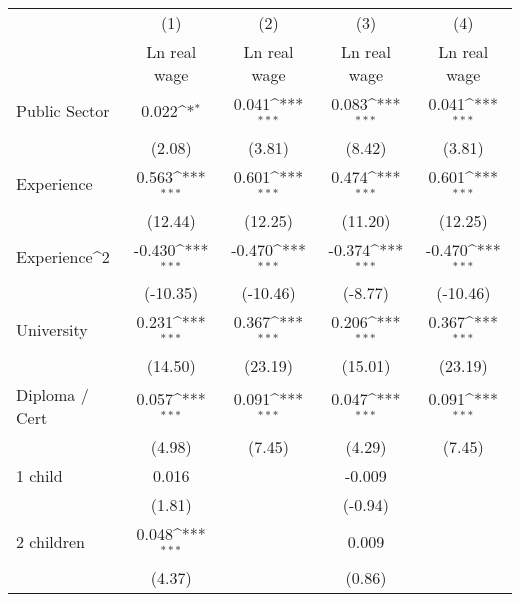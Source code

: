 {
\def\sym#1{\ifmmode^{#1}\else\(^{#1}\)\fi}
\begin{tabular}{l*{4}{c}}
\hline\hline
                    &\multicolumn{1}{c}{(1)}&\multicolumn{1}{c}{(2)}&\multicolumn{1}{c}{(3)}&\multicolumn{1}{c}{(4)}\\
                    &\multicolumn{1}{c}{Ln real wage}&\multicolumn{1}{c}{Ln real wage}&\multicolumn{1}{c}{Ln real wage}&\multicolumn{1}{c}{Ln real wage}\\
\hline
Public Sector       &       0.022\sym{*}  &       0.041\sym{***}&       0.083\sym{***}&       0.041\sym{***}\\
                    &      (2.08)         &      (3.81)         &      (8.42)         &      (3.81)         \\
[1em]
Experience          &       0.563\sym{***}&       0.601\sym{***}&       0.474\sym{***}&       0.601\sym{***}\\
                    &     (12.44)         &     (12.25)         &     (11.20)         &     (12.25)         \\
[1em]
Experience^{2}      &      -0.430\sym{***}&      -0.470\sym{***}&      -0.374\sym{***}&      -0.470\sym{***}\\
                    &    (-10.35)         &    (-10.46)         &     (-8.77)         &    (-10.46)         \\
[1em]
University          &       0.231\sym{***}&       0.367\sym{***}&       0.206\sym{***}&       0.367\sym{***}\\
                    &     (14.50)         &     (23.19)         &     (15.01)         &     (23.19)         \\
[1em]
Diploma / Cert      &       0.057\sym{***}&       0.091\sym{***}&       0.047\sym{***}&       0.091\sym{***}\\
                    &      (4.98)         &      (7.45)         &      (4.29)         &      (7.45)         \\
[1em]
1 child             &       0.016         &                     &      -0.009         &                     \\
                    &      (1.81)         &                     &     (-0.94)         &                     \\
[1em]
2 children          &       0.048\sym{***}&                     &       0.009         &                     \\
                    &      (4.37)         &                     &      (0.86)         &                     \\

\end{tabular}}
